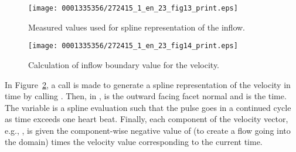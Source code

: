 \begin{figure}[!t]
\texttt{[image: 0001335356/272415\_1\_en\_23\_fig13\_print.eps]}
\caption{Measured values used for spline representation of the inflow.}
\label{fig:kvs-2:inflow_codeI}
\vspace*{5pt}
\end{figure}

\begin{figure}[!t]
\centering
\texttt{[image: 0001335356/272415\_1\_en\_23\_fig14\_print.eps]}
\caption{Calculation of inflow boundary value for the velocity.}
\label{fig:kvs-2:inflow_codeII}\vspace*{-5pt}
\end{figure}


In Figure~\ref{fig:kvs-2:inflow_codeII}, a call is made to generate a spline
representation of the velocity in time by calling .
Then, in ,  is the outward facing facet normal
and  is the time. The variable  is a spline evaluation
such that the pulse goes in a continued cycle as time exceeds one
heart beat. Finally, each component of the velocity vector, e.g.,
, is given the component-wise negative value of 
(to create a flow going into the domain) times the velocity value
corresponding to the current time.

